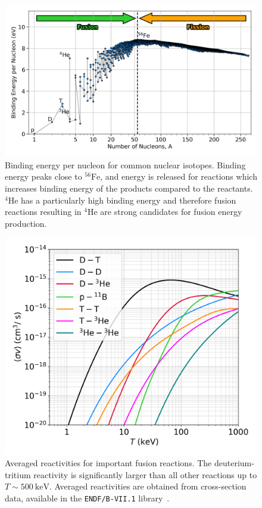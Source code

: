 \begin{figure}[t!]
    \includegraphics[width=0.9\linewidth]{Introduction/Images/BE_per_nucleon.png}
    \centering
    \caption{Binding energy per nucleon for common nuclear isotopes.
    Binding energy peaks close to ${}^{56}\text{Fe}$, and energy is released for reactions which increases binding energy of the products compared to the reactants.
    ${}^{4}\text{He}$ has a particularly high binding energy and therefore fusion reactions resulting in ${}^{4}\text{He}$ are strong candidates for fusion energy production.}%
    \label{fig:intro_BEperNucleon}
\end{figure}

\begin{figure}[t!]
    \includegraphics[width=0.6\linewidth]{Introduction/Images/fusion-reactivities.png}
    \centering
    \caption{Averaged reactivities for important fusion reactions.
    The deuterium-tritium reactivity is significantly larger than all other reactions up to $T\sim500\ \text{keV}$.
    Averaged reactivities are obtained from cross-section data, available in the \texttt{ENDF/B-VII.1} library~\cite{chadwick_endf_2011}.
    }%
    \label{fig:intro_reactivities}
\end{figure}


